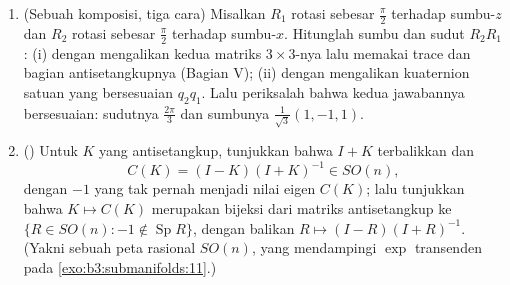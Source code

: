 \begin{problem}
\begin{enumerate}[resume]
  \item (Sebuah komposisi, tiga cara) Misalkan $R_1$ rotasi
        sebesar $\frac\pi2$ terhadap sumbu-$z$ dan $R_2$
        rotasi sebesar $\frac\pi2$ terhadap sumbu-$x$. Hitunglah
        sumbu dan sudut $R_2R_1$: (i) dengan mengalikan
        kedua matriks $3\times3$-nya lalu memakai
        trace dan bagian antisetangkupnya (Bagian V); (ii) dengan
        mengalikan kuaternion satuan yang bersesuaian
        $q_2q_1$. Lalu periksalah bahwa kedua jawabannya bersesuaian: sudutnya
        $\frac{2\pi}3$ dan sumbunya $\frac1{\sqrt3}(1, -1, 1)$.
  \item () Untuk $K$ yang antisetangkup, tunjukkan
        bahwa $I + K$ terbalikkan dan
        \[
        C(K) = (I - K)(I + K)^{-1} \in SO(n),
        \]
        dengan $-1$ yang tak pernah menjadi nilai eigen $C(K)$; lalu tunjukkan bahwa
        $K \mapsto C(K)$ merupakan bijeksi dari matriks antisetangkup
        ke $\{R \in SO(n) : -1 \notin
        \operatorname{Sp}R\}$, dengan balikan $R \mapsto (I -
        R)(I + R)^{-1}$. (Yakni sebuah peta rasional $SO(n)$, yang
        mendampingi $\exp$ transenden pada
        \cref{exo:b3:submanifolds:11}.)

\end{enumerate}
\end{problem}
